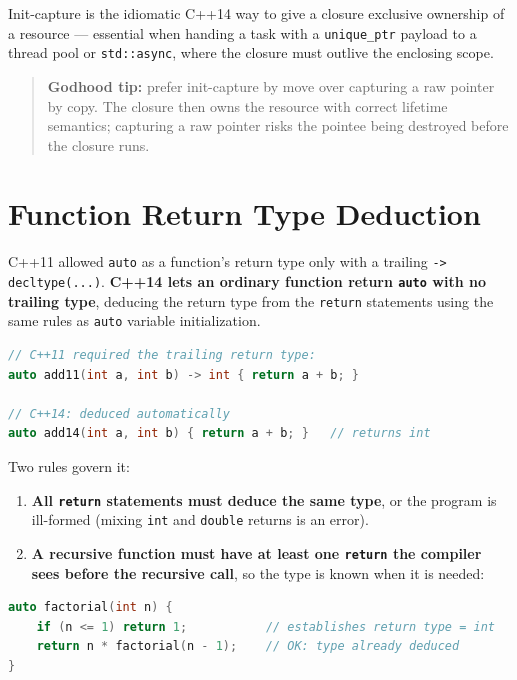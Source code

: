 Init-capture is the idiomatic C++14 way to give a closure exclusive ownership of a resource --- essential when handing a task with a \texttt{unique\_ptr} payload to a thread pool or \texttt{std::async}, where the closure must outlive the enclosing scope.

\begin{quote}
\textbf{Godhood tip:} prefer init-capture by move over capturing a raw pointer by copy. The closure then owns the resource with correct lifetime semantics; capturing a raw pointer risks the pointee being destroyed before the closure runs.
\end{quote}

\section{Function Return Type Deduction}
\label{sec:c14-return-type-deduction}

C++11 allowed \texttt{auto} as a function's return type only with a trailing \texttt{-> decltype(...)}. \textbf{C++14 lets an ordinary function return \texttt{auto} with no trailing type}, deducing the return type from the \texttt{return} statements using the same rules as \texttt{auto} variable initialization.

\begin{lstlisting}[language=C++,caption={Return type deduction}]
// C++11 required the trailing return type:
auto add11(int a, int b) -> int { return a + b; }

// C++14: deduced automatically
auto add14(int a, int b) { return a + b; }   // returns int
\end{lstlisting}

Two rules govern it:

\begin{enumerate}
    \item \textbf{All \texttt{return} statements must deduce the same type}, or the program is ill-formed (mixing \texttt{int} and \texttt{double} returns is an error).
    \item \textbf{A recursive function must have at least one \texttt{return} the compiler sees before the recursive call}, so the type is known when it is needed:
\end{enumerate}

\begin{lstlisting}[language=C++,caption={Recursion with deduced return type}]
auto factorial(int n) {
    if (n <= 1) return 1;           // establishes return type = int
    return n * factorial(n - 1);    // OK: type already deduced
}
\end{lstlisting}

